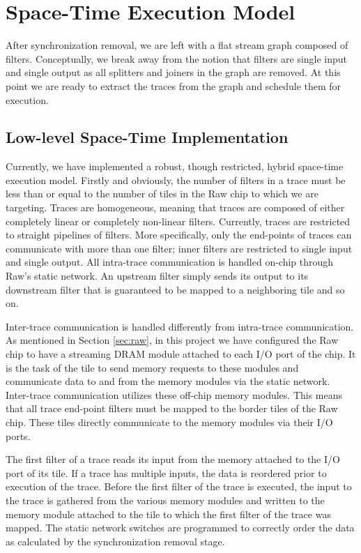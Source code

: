 \section{Space-Time Execution Model}
\label{sec:implementation}
After synchronization removal, we are left with a flat stream graph
composed of filters.  Conceptually, we break away from the notion that
filters are single input and single output as all splitters and
joiners in the graph are removed.  At this point we are ready to
extract the traces from the graph and schedule them for execution.  


\subsection{Low-level Space-Time Implementation}
Currently, we have implemented a robust, though restricted, hybrid
space-time execution model.  Firstly and obviously, the number of
filters in a trace must be less than or equal to the number of tiles
in the Raw chip to which we are targeting.  Traces are homogeneous,
meaning that traces are composed of either completely linear or
completely non-linear filters.  Currently, traces are restricted to
straight pipelines of filters.  More specifically, only the end-points
of traces can communicate with more than one filter; inner filters are
restricted to single input and single output.  All intra-trace
communication is handled on-chip through Raw's static network.  An
upstream filter simply sends its output to its downstream filter that
is guaranteed to be mapped to a neighboring tile and so on.

Inter-trace communication is handled differently from intra-trace
communication.  As mentioned in Section \ref{sec:raw}, in this
project we have configured the Raw chip to have a streaming DRAM
module attached to each I/O port of the chip.  It is the task of the
tile to send memory requests to these modules and communicate data to
and from the memory modules via the static network.  Inter-trace
communication utilizes these off-chip memory modules.  This means that
all trace end-point filters must be mapped to the border tiles of the
Raw chip.  These tiles directly communicate to the memory modules via
their I/O ports.  

The first filter of a trace reads its input from the memory attached
to the I/O port of its tile.  If a trace has multiple inputs, the data
is reordered prior to execution of the trace.  Before the first filter
of the trace is executed, the input to the trace is gathered from the
various memory modules and written to the memory module attached to
the tile to which the first filter of the trace was mapped.  The
static network switches are programmed to correctly order the data as
calculated by the synchronization removal stage.

